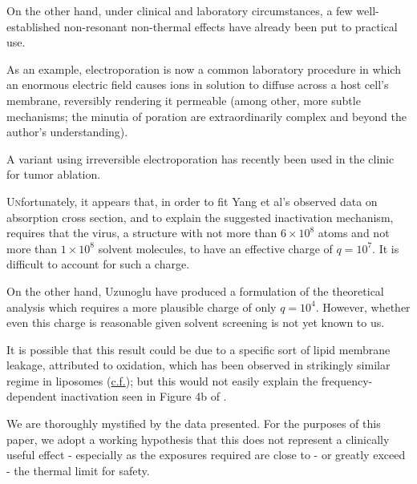 \documentclass[paper.tex]{subfiles}
\begin{document}
\begin{multicols}{1}
On the other hand, under clinical and laboratory circumstances, a few well-established non-resonant non-thermal effects have already been put to practical use. 

As an example, electroporation is now a common laboratory procedure in which an enormous electric field causes ions in solution to diffuse across a host cell's membrane, reversibly rendering it permeable (among other, more subtle mechanisms; the minutia of poration are extraordinarily complex and beyond the author's understanding\cite{Theoretical2007}). 

A variant using irreversible electroporation\cite{Irreversible2013} has recently been used in the clinic\cite{Nonthermal2013} for tumor ablation.%

\lettrine{U}nfortunately, it appears that, in order to fit Yang et al's observed data on absorption cross section, and to explain the suggested inactivation mechanism, requires that the virus, a structure with not more than $6 \times 10^8$ atoms and not more than $1 \times 10^8$ solvent molecules, to have an effective charge of $q=10^7$. It is difficult to account for such a charge.

On the other hand, Uzunoglu have produced a formulation of the theoretical analysis which requires a more plausible charge of only $q=10^4$. However, whether even this charge is reasonable given solvent screening is not yet known to us.\footnotemark



It is possible that this result could be due to a specific sort of lipid membrane leakage, attributed to oxidation, which has been observed in strikingly similar regime in liposomes (\hyperref[sec:liburdy]{c.f.}); but this would not easily explain the frequency-dependent inactivation seen in Figure 4b of \cite{Efficient2015}.

We are thoroughly mystified by the data presented. For the purposes of this paper, we adopt a working hypothesis that this does not represent a clinically useful effect - especially as the exposures required are close to - or greatly exceed - the thermal limit for safety.


\end{multicols}
\end{document}
